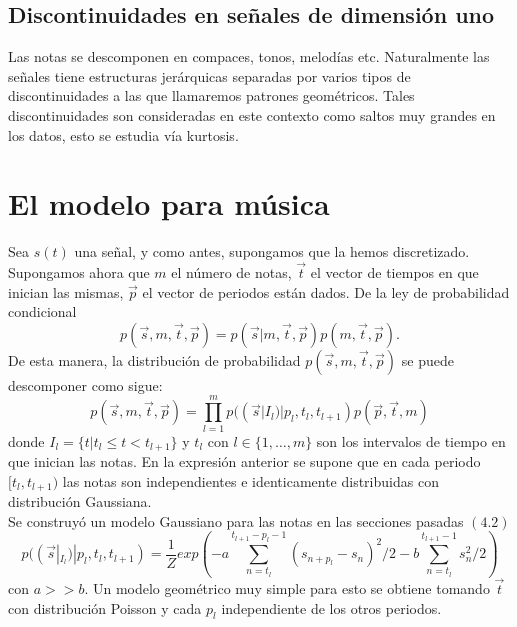 \documentclass[a4paper]{article}
\begin{document}
\subsection{\sffamily Discontinuidades en señales de dimensión uno}
Las notas se descomponen en compaces, tonos, melodías etc. Naturalmente las señales tiene estructuras jerárquicas separadas por varios tipos de discontinuidades a las que llamaremos patrones geométricos. Tales discontinuidades son consideradas en este contexto como saltos muy grandes en los datos, esto se estudia vía kurtosis.  

\section{\sffamily El modelo para música}
Sea $s(t)$ una señal, y como antes, supongamos que la hemos discretizado. Supongamos ahora que $m$ el número de notas, $\overrightarrow{t}$ el vector de tiempos en que inician las mismas, $\overrightarrow{p}$ el vector de periodos están dados. De la ley de probabilidad condicional $$
p(\overrightarrow{s},m,\overrightarrow{t},\overrightarrow{p})=p(\overrightarrow{s}|m,\overrightarrow{t},\overrightarrow{p})p(m,\overrightarrow{t},\overrightarrow{p}).
$$
De esta manera, la distribución de probabilidad $p(\overrightarrow{s},m,\overrightarrow{t},\overrightarrow{p})$ se puede descomponer como sigue:
$$
p(\overrightarrow{s},m,\overrightarrow{t},\overrightarrow{p})=\prod_{l=1}^{m} p((\overrightarrow{s}|I_{l})|p_{l},t_{l},t_{l+1})p(\overrightarrow{p},\overrightarrow{t},m)
$$ donde $I_{l}=\{t| t_{l}\leq t < t_{l+1}\}$ y $t_{l}$ con $l \in \{1,\dots, m\}$ son los intervalos de tiempo en que inician las notas. En la expresión anterior se supone que en cada periodo $[t_{l},t_{l+1})$ las notas son independientes e identicamente distribuidas con distribución Gaussiana.\\

\noindent Se construyó un modelo Gaussiano para las notas en las secciones pasadas $(4.2)$ $$p((\overrightarrow{s}|_{I_{l}})|p_{l},t_{l},t_{l+1})
=\frac{1}{Z}exp(-a\sum_{n=t_{l}}^{t_{l+1}-p_{l}-1}(s_{n+p_{l}}-s_{n})^{2}/2-b\sum_{n=t_{l}}^{t_{l+1}-1}s_{n}^{2}/2)
$$ con $a>>b.$
Un modelo geométrico muy simple para esto se obtiene tomando $\overrightarrow{t}$ con distribución Poisson y cada $p_{l}$ independiente de los otros periodos.\\
\end{document}
